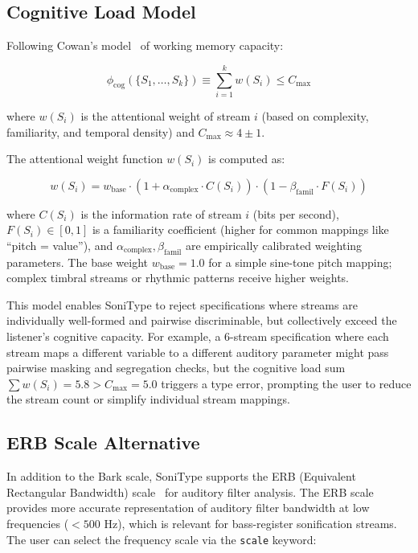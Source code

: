\documentclass[sigchi, nonacm]{acmart}
\begin{document}
\subsection{Cognitive Load Model}

Following Cowan's model~\cite{cowan2001magical} of working memory capacity:

\begin{equation}
\phi_\mathrm{cog}(\{S_1, \ldots, S_k\}) \equiv \sum_{i=1}^{k} w(S_i) \leq C_\mathrm{max}
\end{equation}

where $w(S_i)$ is the attentional weight of stream $i$ (based on complexity, familiarity, and temporal density) and $C_\mathrm{max} \approx 4 \pm 1$.

The attentional weight function $w(S_i)$ is computed as:

\begin{equation}
w(S_i) = w_\mathrm{base} \cdot (1 + \alpha_\mathrm{complex} \cdot C(S_i)) \cdot (1 - \beta_\mathrm{famil} \cdot F(S_i))
\end{equation}

where $C(S_i)$ is the information rate of stream $i$ (bits per second), $F(S_i) \in [0, 1]$ is a familiarity coefficient (higher for common mappings like ``pitch = value''), and $\alpha_\mathrm{complex}, \beta_\mathrm{famil}$ are empirically calibrated weighting parameters. The base weight $w_\mathrm{base} = 1.0$ for a simple sine-tone pitch mapping; complex timbral streams or rhythmic patterns receive higher weights.

This model enables SoniType to reject specifications where streams are individually well-formed and pairwise discriminable, but collectively exceed the listener's cognitive capacity. For example, a 6-stream specification where each stream maps a different variable to a different auditory parameter might pass pairwise masking and segregation checks, but the cognitive load sum $\sum w(S_i) = 5.8 > C_\mathrm{max} = 5.0$ triggers a type error, prompting the user to reduce the stream count or simplify individual stream mappings.

\subsection{ERB Scale Alternative}

In addition to the Bark scale, SoniType supports the ERB (Equivalent Rectangular Bandwidth) scale~\cite{glasberg1990derivation} for auditory filter analysis. The ERB scale provides more accurate representation of auditory filter bandwidth at low frequencies ($< 500$ Hz), which is relevant for bass-register sonification streams. The user can select the frequency scale via the \texttt{scale} keyword:
\end{document}
